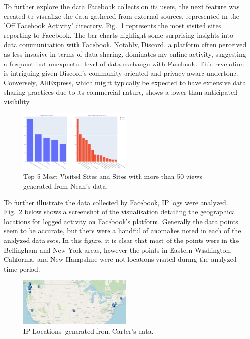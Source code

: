 \documentclass[conference, letterpaper, 11pt]{IEEEtran}
\begin{document}
To further explore the data Facebook collects on its users, the next feature was created to visualize the data gathered from external sources, represented in the 'Off Facebook Activity' directory. Fig.~\ref{fig:ofa} represents the most visited sites reporting to Facebook. The bar charts highlight some surprising insights into data communication with Facebook. Notably, Discord, a platform often perceived as less invasive in terms of data sharing, dominates my online activity, suggesting a frequent but unexpected level of data exchange with Facebook. This revelation is intriguing given Discord's community-oriented and privacy-aware undertone. Conversely, AliExpress, which might typically be expected to have extensive data sharing practices due to its commercial nature, shows a lower than anticipated visibility.

\begin{figure}[htbp]
    \centering
    \includegraphics[width=0.5\textwidth]{img/ofa.png}
    \caption{Top 5 Most Visited Sites and Sites with more than 50 views, generated from Noah’s data.}
    \label{fig:ofa}
\end{figure}

To further illustrate the data collected by Facebook, IP logs were analyzed. Fig.~\ref{fig:ipl} below shows a screenshot of the visualization detailing the geographical locations for logged activity on Facebook's platform. Generally the data points seem to be accurate, but there were a handful of anomalies noted in each of the analyzed data sets. In this figure, it is clear that most of the points were in the Bellingham and New York areas, however the points in Eastern Washington, California, and New Hampshire were not locations visited during the analyzed time period.

\begin{figure}[htbp]
    \centering
    \includegraphics[width=0.5\textwidth]{img/ipl.png}
    \caption{IP Locations, generated from Carter's data.}
    \label{fig:ipl}
\end{figure}
\end{document}
